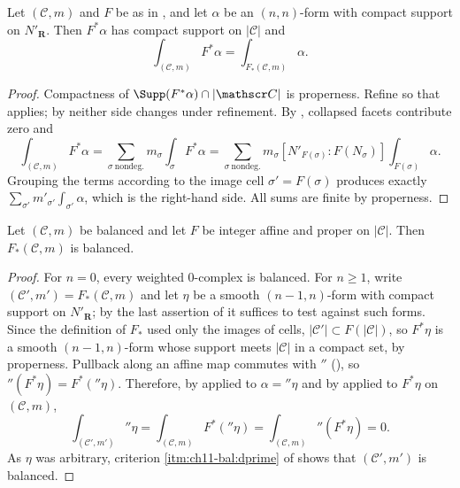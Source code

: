 \begin{proposition}
\label{prop:ch11-pushforward-integral}
Let $(\mathscr C,m)$ and $F$ be as in
, and let $\alpha$ be an $(n,n)$-form with
compact support on $N'_{\mathbf R}$.  Then $F^*\alpha$ has compact support
on $|\mathscr C|$ and
\[
 \int_{(\mathscr C,m)}F^*\alpha
 =\int_{F_*(\mathscr C,m)}\alpha .
\]
\end{proposition}

\begin{proof}
Compactness of $\Supp(F^*\alpha)\cap|\mathscr C|$ is properness.  Refine so
that  applies; by
 neither side changes under
refinement.  By , collapsed facets
contribute zero and
\[
 \int_{(\mathscr C,m)}F^*\alpha
 =\sum_{\sigma\ \text{nondeg.}}m_\sigma\int_\sigma F^*\alpha
 =\sum_{\sigma\ \text{nondeg.}}
   m_\sigma[N'_{F(\sigma)}:F(N_\sigma)]\int_{F(\sigma)}\alpha .
\]
Grouping the terms according to the image cell $\sigma'=F(\sigma)$ produces
exactly $\sum_{\sigma'}m'_{\sigma'}\int_{\sigma'}\alpha$, which is the
right-hand side.  All sums are finite by properness.
\end{proof}

\begin{theorem}
\label{thm:ch11-pushforward-balanced}
Let $(\mathscr C,m)$ be balanced and let $F$ be integer affine and proper on
$|\mathscr C|$.  Then $F_*(\mathscr C,m)$ is balanced.
\end{theorem}

\begin{proof}
For $n=0$, every weighted $0$-complex is balanced.  For $n\ge1$,
write $(\mathscr C',m')=F_*(\mathscr C,m)$ and let $\eta$ be a smooth
$(n-1,n)$-form with compact support on $N'_{\mathbf R}$; by the last
assertion of  it suffices to test
against such forms.  Since the definition of $F_*$ used
only the images of cells, $|\mathscr C'|\subset F(|\mathscr C|)$, so
$F^*\eta$ is a smooth $(n-1,n)$-form whose support meets $|\mathscr C|$ in a
compact set, by properness.  Pullback along an affine map commutes with
$\dprime$ (), so
$\dprime(F^*\eta)=F^*(\dprime\eta)$.  Therefore, by
 applied to $\alpha=\dprime\eta$ and by
 applied to $F^*\eta$ on $(\mathscr C,m)$,
\[
 \int_{(\mathscr C',m')}\dprime\eta
 =\int_{(\mathscr C,m)}F^*(\dprime\eta)
 =\int_{(\mathscr C,m)}\dprime(F^*\eta)
 =0 .
\]
As $\eta$ was arbitrary, criterion
\cref{itm:ch11-bal:dprime} of
 shows that
$(\mathscr C',m')$ is balanced.
\end{proof}

